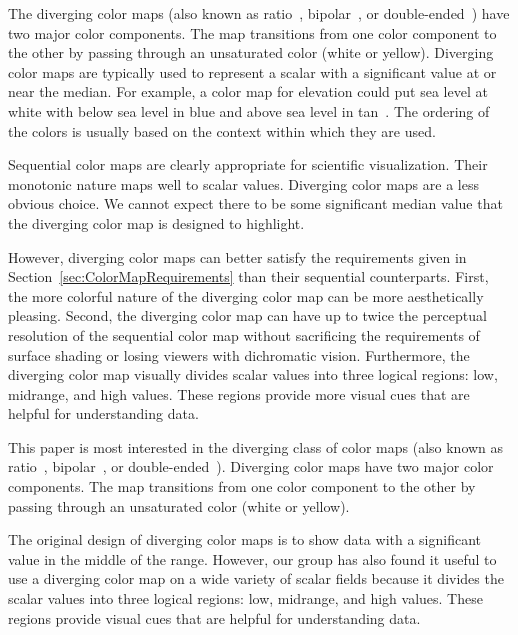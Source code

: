 \documentclass{llncs}
\begin{document}
{  The diverging color maps (also known as ratio~\cite{Ware04},
  bipolar~\cite{Spence01}, or double-ended~\cite{Rheingans99}) have two major
  color components.  The map transitions from one color component to the
  other by passing through an unsaturated color (white or yellow).  Diverging
  color maps are typically used to represent a scalar with a significant
  value at or near the median.  For example, a color map for elevation could
  put sea level at white with below sea level in blue and above sea level in
  tan~\cite{Tufte97}.  The ordering of the colors is usually based on the
  context within which they are used.

  Sequential color maps are clearly appropriate for scientific visualization.
  Their monotonic nature maps well to scalar values.  Diverging color maps
  are a less obvious choice.  We cannot expect there to be some significant
  median value that the diverging color map is designed to highlight.

  However, diverging color maps can better satisfy the requirements given in
  Section~\ref{sec:ColorMapRequirements} than their sequential counterparts.
  First, the more colorful nature of the diverging color map can be more
  aesthetically pleasing.  Second, the diverging color map can have up to
  twice the perceptual resolution of the sequential color map without
  sacrificing the requirements of surface shading or losing viewers
  with dichromatic vision.  Furthermore, the diverging color map visually
  divides scalar values into three logical regions: low, midrange, and high
  values.  These regions provide more visual cues that are helpful for
  understanding data.

}{ %

  This paper is most interested in the diverging class of color maps (also
  known as ratio~\cite{Ware04}, bipolar~\cite{Spence01}, or
  double-ended~\cite{Rheingans99}).  Diverging color maps have two major
  color components.  The map transitions from one color component to the
  other by passing through an unsaturated color (white or yellow).

  The original design of diverging color maps is to show data with a
  significant value in the middle of the range.  However, our group has also
  found it useful to use a diverging color map on a wide variety of scalar
  fields because it divides the scalar values into three logical regions:
  low, midrange, and high values.  These regions provide visual cues that
  are helpful for understanding data.

}
\end{document}
